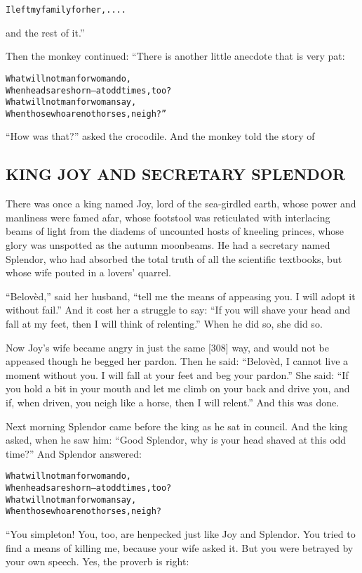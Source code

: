 \documentclass{article}
\renewenvironment{verbatim}{\begin{alltt}\normalfont\begin{centering}}{\end{centering}\end{alltt}}
\begin{document}
\begin{verbatim}
I left my family for her, ....
\end{verbatim}
and the rest of it.”

Then the monkey continued: “There is another little anecdote that
is very pat:

\begin{verbatim}
What will not man for woman do,
When heads are shorn--at odd times, too?
What will not man for woman say,
When those who are not horses, neigh?”
\end{verbatim}
``How was that?'' asked the crocodile. And the monkey told the
story of

\subsection{KING JOY AND SECRETARY SPLENDOR}

There was once a king named Joy, lord of the sea-girdled earth,
whose power and manliness were famed afar, whose footstool was
reticulated with interlacing beams of light from the diadems of
uncounted hosts of kneeling princes, whose glory was unspotted as
the autumn moonbeams. He had a secretary named Splendor, who had
absorbed the total truth of all the scientific textbooks, but whose
wife pouted in a lovers' quarrel.

``Belovèd,'' said her husband,
``tell me the means of appeasing you. I will adopt it without fail.''
And it cost her a struggle to say:
``If you will shave your head and fall at my feet, then I will think of relenting.''
When he did so, she did so.

Now Joy's wife became angry in just the same [308] way, and would
not be appeased though he begged her pardon. Then he said:
``Belovèd, I cannot live a moment without you. I will fall at your feet and beg your pardon.''
She said:
``If you hold a bit in your mouth and let me climb on your back and drive you, and if, when driven, you neigh like a horse, then I will relent.''
And this was done.

Next morning Splendor came before the king as he sat in council.
And the king asked, when he saw him:
``Good Splendor, why is your head shaved at this odd time?'' And
Splendor answered:

\begin{verbatim}
What will not man for woman do,
When heads are shorn--at odd times, too?
What will not man for woman say,
When those who are not horses, neigh?                   
\end{verbatim}
“You simpleton! You, too, are henpecked just like Joy and Splendor.
You tried to find a means of killing me, because your wife asked
it. But you were betrayed by your own speech. Yes, the proverb is
right:
\end{document}
